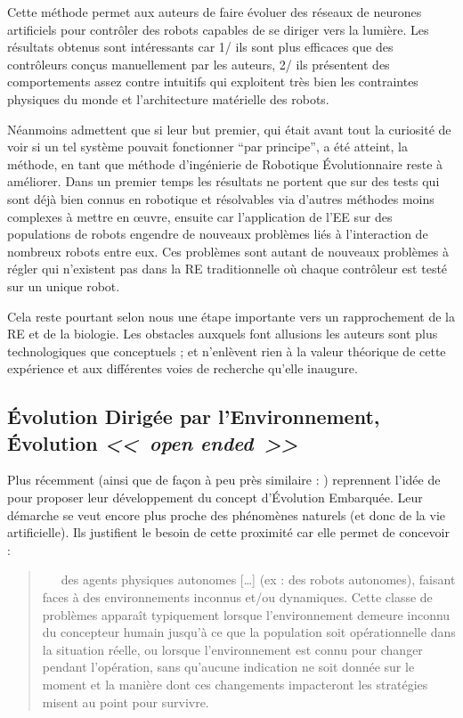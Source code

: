 Cette méthode permet aux auteurs de faire évoluer des réseaux de neurones artificiels pour contrôler des robots capables de se diriger vers la lumière. Les résultats obtenus sont intéressants car 1/ ils sont plus efficaces que des contrôleurs conçus manuellement par les auteurs, 2/ ils présentent des comportements assez contre intuitifs qui exploitent très bien les contraintes physiques du monde et l'architecture matérielle des robots.

Néanmoins \cite{watson02embodiedevolutiondistributingevolutionaryalgorithmpopulationrobots} admettent que si leur but premier, qui était avant tout la curiosité de voir si un tel système pouvait fonctionner ``par principe'', a été atteint, la méthode, en tant que méthode d'ingénierie de Robotique \'Evolutionnaire reste à améliorer. Dans un premier temps les résultats ne portent que sur des tests qui sont déjà bien connus en robotique et résolvables via d'autres méthodes moins complexes à mettre en {\oe}uvre, ensuite car l'application de l'EE sur des populations de robots engendre de nouveaux problèmes liés à l'interaction de nombreux robots entre eux. Ces problèmes sont autant de nouveaux problèmes à régler qui n'existent pas dans la RE traditionnelle où chaque contrôleur est testé sur un unique robot.

Cela reste pourtant selon nous une étape importante vers un rapprochement de la RE et de la biologie. Les obstacles auxquels font allusions les auteurs sont plus technologiques que conceptuels ; et n'enlèvent rien à la valeur théorique de cette expérience et aux différentes voies de recherche qu'elle inaugure.

\subsection{\'Evolution Dirigée par l'Environnement, \'Evolution \emph{<<~open ended~>>}}

Plus récemment \cite{bredeche11mcmds} (ainsi que de façon à peu près similaire : \cite{trueba11taskdrivenspeciesevolutionaryroboticteams}) reprennent l'idée de \cite{watson02embodiedevolutiondistributingevolutionaryalgorithmpopulationrobots} pour proposer leur développement du concept d'\'Evolution Embarquée. Leur démarche se veut encore plus proche des phénomènes naturels (et donc de la vie artificielle). Ils justifient le besoin de cette proximité car elle permet de concevoir :
\begin{quotation}
   des agents physiques autonomes [\dots] (ex : des robots autonomes), faisant faces à des environnements inconnus et/ou dynamiques. Cette classe de problèmes apparaît typiquement lorsque l'environnement demeure inconnu du concepteur humain jusqu'à ce que la population soit opérationnelle dans la situation réelle, ou lorsque l'environnement est connu pour changer pendant l'opération, sans qu'aucune indication ne soit donnée sur le moment et la manière dont ces changements impacteront les stratégies misent au point pour survivre.
   \\\citep[p.1]{bredeche11mcmds}
\end{quotation}


